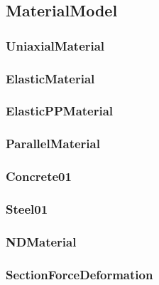 \subsection{{\bf MaterialModel}}



\pagebreak \subsubsection{{\bf UniaxialMaterial}}


\pagebreak \subsubsection{ElasticMaterial}


\pagebreak \subsubsection{ElasticPPMaterial}


\pagebreak \subsubsection{ParallelMaterial}


\pagebreak \subsubsection{Concrete01}


\pagebreak \subsubsection{Steel01}



\pagebreak \subsubsection{{\bf NDMaterial}}





\pagebreak \subsubsection{{\bf SectionForceDeformation}}


